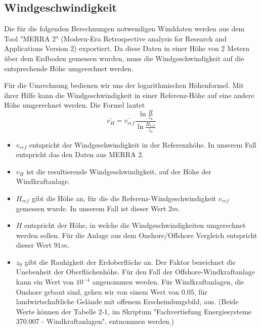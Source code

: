 \documentclass[a4paper,12pt]{article}
\begin{document}
	\subsection{Windgeschwindigkeit}
	Die für die folgenden Berechnungen notwendigen Winddaten werden aus dem Tool "MERRA 2" (Modern-Era Retrospective analysis for Research and Applications Version 2) exportiert. Da diese Daten in einer Höhe von 2 Metern über dem Erdboden gemessen wurden, muss die Windgeschwindigkeit auf die entsprechende Höhe umgerechnet werden.\\ \par
	\noindent Für die Umrechnung bedienen wir uns der logarithmischen Höhenformel. Mit ihrer Hilfe kann die Windgeschwindigkeit in einer Referenz-Höhe auf eine andere Höhe umgerechnet werden.
	\newline Die Formel lautet
	\begin{equation}
	\bar{v_H} = \bar{v_{ref}}\frac{\ln{\frac{H}{z_0}}}{\ln{\frac{H_{ref}}{z_0}}}
	\end{equation}
	\begin{itemize}
		\item $v_{ref}$ entspricht der Windgeschwindigkeit in der Referenzhöhe. In unserem Fall entspricht das den Daten aus MERRA 2.
		\item $v_H$ ist die resultierende Windgeschwindigkeit, auf der Höhe der Windkraftanlage.
		\item $H_{ref}$ gibt die Höhe an, für die die Referenz-Windgeschwindigkeit $v_{ref}$ gemessen wurde. In unserem Fall ist dieser Wert $2m$.
		\item $H$ entspricht der Höhe, in welche die Windgeschwindigkeiten umgerechnet werden sollen. Für die Anlage aus dem Onshore/Offshore Vergleich entspricht dieser Wert $91m$.
		\item $z_0$ gibt die Rauhigkeit der Erdoberfläche an. Der Faktor bezeichnet die Unebenheit der Oberflächenhöhe. Für den Fall der Offshore-Windkraftanlage kann ein Wert von $10^{-4}$ angenommen werden. Für Windkraftanlagen, die Onshore gebaut sind, gehen wir von einem Wert von $0.05$, für landwirtschaftliche Gelände mit offenem Erscheindungsbild, aus. (Beide Werte können der Tabelle 2-1, im Skriptum "Fachvertiefung Energiesysteme 370.007 -  Windkraftanlagen", entnommen werden.)
	\end{itemize}
\end{document}
